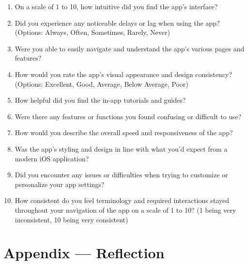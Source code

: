 \documentclass[12pt, titlepage]{article}
\begin{document}
    \begin{enumerate}
        \item On a scale of 1 to 10, how intuitive did you find the app's interface?
        \item Did you experience any noticeable delays or lag when using the app? (Options: Always, Often, Sometimes, Rarely, Never)
        \item Were you able to easily navigate and understand the app's various pages and features?
        \item How would you rate the app's visual appearance and design consistency? (Options: Excellent, Good, Average, Below Average, Poor)
        \item How helpful did you find the in-app tutorials and guides?
        \item Were there any features or functions you found confusing or difficult to use?
        \item How would you describe the overall speed and responsiveness of the app?
        \item Was the app's styling and design in line with what you'd expect from a modern iOS application?
        \item Did you encounter any issues or difficulties when trying to customize or personalize your app settings?
        \item How consistent do you feel terminology and required interactions stayed throughout your navigation of the app on a scale of 1 to 10? (1 being very inconsistent, 10 being very consistent)
    \end{enumerate}

    \newpage{}
    \section*{Appendix --- Reflection}
\end{document}
